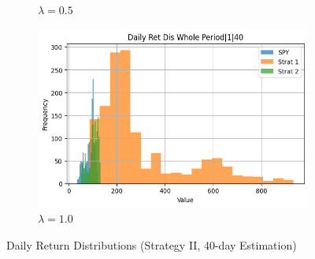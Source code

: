 \documentclass[12pt]{article}
\begin{document}
\begin{figure}[H]
\begin{subfigure}{0.32\textwidth}
\caption{$\lambda=0.5$}
\end{subfigure}
\begin{subfigure}{0.32\textwidth}
\includegraphics[width=\linewidth]{"plots/daily_ret_dis_whole_period_1_40.png"}
\caption{$\lambda=1.0$}
\end{subfigure}
\caption{Daily Return Distributions (Strategy II, 40-day Estimation)}
\label{fig:ret_dist_40}
\end{figure}
\end{document}
